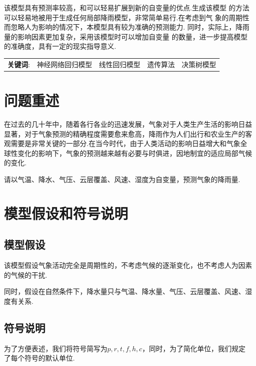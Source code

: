 \documentclass[UTF8, a4paper]{ctexart}
\begin{document}
该模型具有预测率较高，和可以轻易扩展到新的自变量的优点.生成该模型
的方法可以轻易地被用于生成任何局部降雨模型，非常简单易行.在考虑到气
象的周期性而忽略人为影响的情况下，本模型具有较为准确的预测能力.
同时，实际上，降雨量的影响因素更加复杂，采用该模型时可以增加自变量
的数量，进一步提高模型的准确度，具有一定的现实指导意义.

\null\vfill %
\begin{flushleft}
	\begin{tabular}{
		>{\centering}p{}
		>{\centering}p{}
		>{\centering}p{}
		>{\centering}p{}
		>{\centering}p{}}
		\textbf{关键词}: & 神经网络回归模型 & 线性回归模型 & 遗传算法 & 决策树模型
	\end{tabular}
\end{flushleft}

\newpage

\section{问题重述}

在过去的几十年中，随着各行各业的迅速发展，气象对于人类生产生活的影响日益
显著，对于气象预测的精确程度需要愈来愈高，降雨作为人们出行和农业生产的客
观需要是非常关键的一部分.在当今时代，由于人类活动的影响日益增大和气象全
球性变化的影响下，气象的预测越来越有必要与时俱进，因地制宜的适应局部气候的变化.

请以气温、降水、气压、云层覆盖、风速、湿度为自变量，预测气象的降雨量.

\section{模型假设和符号说明}

\subsection{模型假设}
该模型假设气象活动完全是周期性的，不考虑气候的逐渐变化，也不考虑人为因素的气候的干扰.

同时，假设在自然条件下，降水量只与气温、降水量、气压、云层覆盖、风速、湿度有关系.

\subsection{符号说明}

为了方便表述，我们将符号简写为$p,r,t,f,h,c$，同时，为了简化单位，我们规定了每个符号的默认单位.
\end{document}
